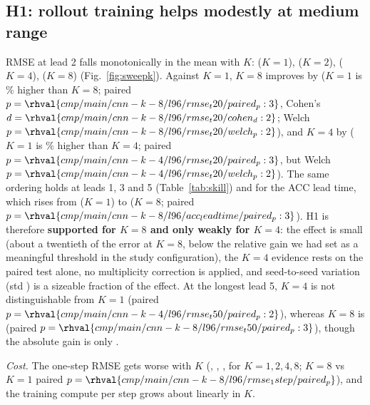 \subsection{H1: rollout training helps modestly at medium range}
RMSE at lead 2 falls monotonically in the mean with $K$:  ($K{=}1$),  ($K{=}2$),  ($K{=}4$),  ($K{=}8$) (Fig.~\ref{fig:sweepk}). Against $K{=}1$, $K{=}8$ improves by  ($K{=}1$ is \% higher than $K{=}8$; paired $p=\rhval{cmp/main/cnn-k-8/l96/rmse_t20/paired_p:3}$, Cohen's $d=\rhval{cmp/main/cnn-k-8/l96/rmse_t20/cohen_d:2}$; Welch $p=\rhval{cmp/main/cnn-k-8/l96/rmse_t20/welch_p:2}$), and $K{=}4$ by  ($K{=}1$ is \% higher than $K{=}4$; paired $p=\rhval{cmp/main/cnn-k-4/l96/rmse_t20/paired_p:3}$, but Welch $p=\rhval{cmp/main/cnn-k-4/l96/rmse_t20/welch_p:2}$). The same ordering holds at leads 1, 3 and 5 (Table~\ref{tab:skill}) and for the ACC lead time, which rises from  ($K{=}1$) to  ($K{=}8$; paired $p=\rhval{cmp/main/cnn-k-8/l96/acc_leadtime/paired_p:3}$). H1 is therefore \textbf{supported for $K{=}8$ and only weakly for $K{=}4$}: the effect is small (about a twentieth of the error at $K{=}8$, below the relative gain we had set as a meaningful threshold in the study configuration), the $K{=}4$ evidence rests on the paired test alone, no multiplicity correction is applied, and seed-to-seed variation (std ) is a sizeable fraction of the effect. At the longest lead 5, $K{=}4$ is not distinguishable from $K{=}1$ (paired $p=\rhval{cmp/main/cnn-k-4/l96/rmse_t50/paired_p:2}$), whereas $K{=}8$ is (paired $p=\rhval{cmp/main/cnn-k-8/l96/rmse_t50/paired_p:3}$), though the absolute gain is only .

\textit{Cost.} The one-step RMSE gets worse with $K$ (, , ,  for $K=1,2,4,8$; $K{=}8$ vs $K{=}1$ paired $p=\rhval{cmp/main/cnn-k-8/l96/rmse_1step/paired_p}$), and the training compute per step grows about linearly in $K$.

